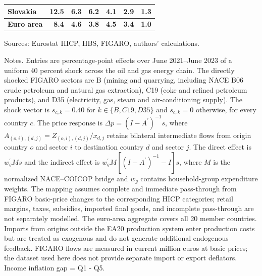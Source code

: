 \begin{table}[H]
\begin{tabular}{lrrrrrr}
Slovakia & 12.5 & 6.3 & 6.2 & 4.1 & 2.9 & 1.3
 \\
\midrule
\textbf{Euro area} & \textbf{8.4} & \textbf{4.6} & \textbf{3.8} & \textbf{4.5} & \textbf{3.4} & \textbf{1.0}
 \\
\bottomrule
\end{tabular}
\par\vspace{0.35em}\footnotesize\noindent Sources: Eurostat HICP, HBS, FIGARO, authors' calculations.
\par\vspace{0.25em}\footnotesize\noindent Notes. Entries are percentage-point effects over June 2021--June 2023 of a uniform 40 percent shock across the oil and gas energy chain. The directly shocked FIGARO sectors are B (mining and quarrying, including NACE B06 crude petroleum and natural gas extraction), C19 (coke and refined petroleum products), and D35 (electricity, gas, steam and air-conditioning supply). The shock vector is $s_{c,k}=0.40$ for $k\in\{B,C19,D35\}$ and $s_{c,k}=0$ otherwise, for every country $c$. The price response is $\Delta p = (I - A^{\prime})^{-1}s$, where $A_{(o,i),(d,j)}=Z_{(o,i),(d,j)}/x_{d,j}$ retains bilateral intermediate flows from origin country $o$ and sector $i$ to destination country $d$ and sector $j$. The direct effect is $w_g^{\prime}Ms$ and the indirect effect is $w_g^{\prime}M[(I-A^{\prime})^{-1}-I]s$, where $M$ is the normalized NACE--COICOP bridge and $w_g$ contains household-group expenditure weights. The mapping assumes complete and immediate pass-through from FIGARO basic-price changes to the corresponding HICP categories; retail margins, taxes, subsidies, imported final goods, and incomplete pass-through are not separately modelled. The euro-area aggregate covers all 20 member countries. Imports from origins outside the EA20 production system enter production costs but are treated as exogenous and do not generate additional endogenous feedback. FIGARO flows are measured in current million euros at basic prices; the dataset used here does not provide separate import or export deflators. Income inflation gap = Q1 - Q5.
\end{table}
\vspace{0.6em}
